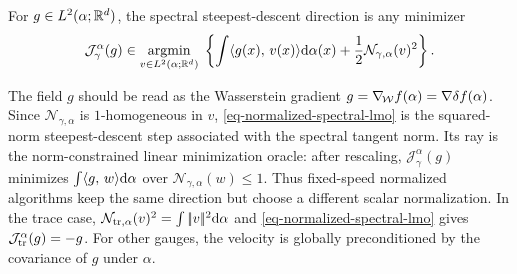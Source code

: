 \begin{defn}\label{def-normalized-spectral-descent}
	For $g\in L^2(\alpha;\mathbb{R}^d)$, the spectral steepest-descent direction is any minimizer
	\begin{equation}\label{eq-normalized-spectral-lmo}
		\mathcal J_{\gamma}^{\alpha}(g)
		\in
		\underset{v\in L^2(\alpha;\mathbb{R}^d)}{\operatorname{argmin}}\;
		\left\{
		\int \langle g(x),\,v(x)\rangle\mathrm{d}\alpha(x)
		+
		\frac12\mathcal N_{\gamma,\alpha}(v)^2
		\right\}.
	\end{equation}
\end{defn}
The field $g$ should be read as the Wasserstein gradient $g=\nabla_{\!\operatorname{\mathcal{W}}} f(\alpha)=\nabla\delta f(\alpha)$. Since $\mathcal N_{\gamma,\alpha}$ is $1$-homogeneous in $v$, \eqref{eq-normalized-spectral-lmo} is the squared-norm steepest-descent step associated with the spectral tangent norm. Its ray is the norm-constrained linear minimization oracle: after rescaling, $\mathcal J_{\gamma}^{\alpha}(g)$ minimizes $\int\langle g,\,w\rangle\mathrm{d}\alpha$ over $\mathcal N_{\gamma,\alpha}(w)\leq1$. Thus fixed-speed normalized algorithms keep the same direction but choose a different scalar normalization. In the trace case, $\mathcal N_{\operatorname{tr},\alpha}(v)^2=\int|\!| v |\!|^2\mathrm{d}\alpha$ and \eqref{eq-normalized-spectral-lmo} gives $\mathcal J_{\operatorname{tr}}^{\alpha}(g)=-g$. For other gauges, the velocity is globally preconditioned by the covariance of $g$ under $\alpha$.

